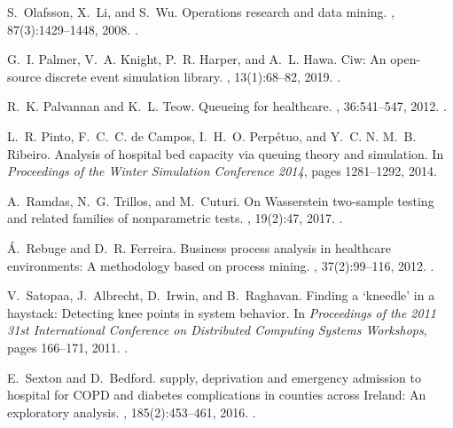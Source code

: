 \documentclass[11pt]{article}
\begin{document}
\begin{thebibliography}{10}
S.~Olafsson, X.~Li, and S.~Wu.
\newblock Operations research and data mining.
, 87(3):1429--1448,
  2008.
\newblock \href {https://doi.org/https://doi.org/10.1016/j.ejor.2006.09.023}
  {}.

G.~I. Palmer, V.~A. Knight, P.~R. Harper, and A.~L. Hawa.
\newblock Ciw: An open-source discrete event simulation library.
, 13(1):68--82, 2019.
\newblock \href {https://doi.org/10.1080/17477778.2018.1473909}
  {}.

R.~K. Palvannan and K.~L. Teow.
\newblock Queueing for healthcare.
, 36:541--547, 2012.
\newblock \href {https://doi.org/10.1007/s10916-010-9499-7}
  {}.

L.~R. {Pinto}, F.~C.~C. {de Campos}, I.~H.~O. {Perp\'{e}tuo}, and Y.~C. N.
  M.~B. {Ribeiro}.
\newblock Analysis of hospital bed capacity via queuing theory and simulation.
\newblock In {\em Proceedings of the Winter Simulation Conference 2014}, pages
  1281--1292, 2014.

A.~Ramdas, N.~G. Trillos, and M.~Cuturi.
\newblock On {W}asserstein two-sample testing and related families of
  nonparametric tests.
, 19(2):47, 2017.
\newblock \href {https://doi.org/10.3390/e19020047}
  {}.

{\'A}.~Rebuge and D.~R. Ferreira.
\newblock Business process analysis in healthcare environments: A methodology
  based on process mining.
, 37(2):99--116, 2012.
\newblock \href {https://doi.org/10.1016/j.is.2011.01.003}
  {}.

V.~Satopaa, J.~Albrecht, D.~Irwin, and B.~Raghavan.
\newblock Finding a `kneedle' in a haystack: Detecting knee points in system
  behavior.
\newblock In {\em Proceedings of the 2011 31st International Conference on
  Distributed Computing Systems Workshops}, pages 166--171, 2011.
\newblock \href {https://doi.org/10.1109/ICDCSW.2011.20}
  {}.

E.~Sexton and D.~Bedford.
 supply, deprivation and emergency admission to hospital for
  {COPD} and diabetes complications in counties across {Ireland}: An
  exploratory analysis.
, 185(2):453--461, 2016.
\newblock \href {https://doi.org/10.1007/s11845-015-1359-5}
  {}.


\end{thebibliography}
\end{document}
